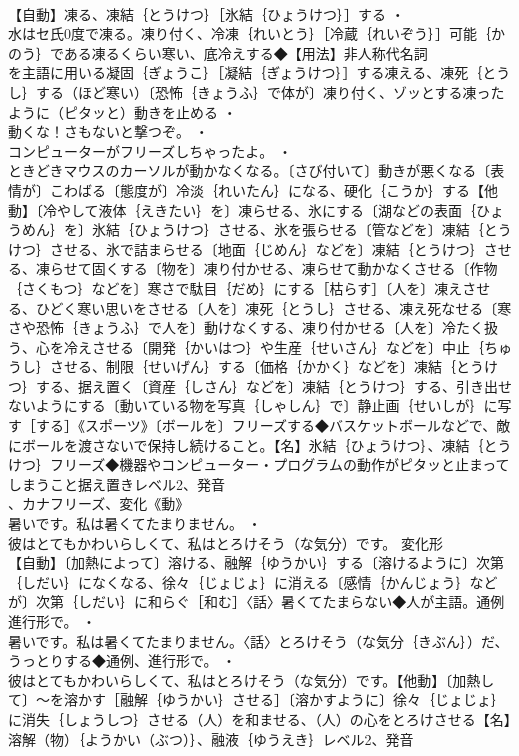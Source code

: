 \documentclass[8pt]{extreport}
\begin{document}
\begin{CJK}{UTF8}{min}
\\	【自動】凍る、凍結｛とうけつ｝［氷結｛ひょうけつ｝］する ・
\\	水はセ氏0度で凍る。凍り付く、冷凍｛れいとう｝［冷蔵｛れいぞう｝］可能｛かのう｝である凍るくらい寒い、底冷えする◆【用法】非人称代名詞
\\	を主語に用いる凝固｛ぎょうこ｝［凝結｛ぎょうけつ｝］する凍える、凍死｛とうし｝する（ほど寒い）〔恐怖｛きょうふ｝で体が〕凍り付く、ゾッとする凍ったように（ピタッと）動きを止める ・
\\	動くな！さもないと撃つぞ。 ・
\\	コンピューターがフリーズしちゃったよ。 ・
\\	ときどきマウスのカーソルが動かなくなる。〔さび付いて〕動きが悪くなる〔表情が〕こわばる〔態度が〕冷淡｛れいたん｝になる、硬化｛こうか｝する【他動】〔冷やして液体｛えきたい｝を〕凍らせる、氷にする〔湖などの表面｛ひょうめん｝を〕氷結｛ひょうけつ｝させる、氷を張らせる〔管などを〕凍結｛とうけつ｝させる、氷で詰まらせる〔地面｛じめん｝などを〕凍結｛とうけつ｝させる、凍らせて固くする〔物を〕凍り付かせる、凍らせて動かなくさせる〔作物｛さくもつ｝などを〕寒さで駄目｛だめ｝にする［枯らす］〔人を〕凍えさせる、ひどく寒い思いをさせる〔人を〕凍死｛とうし｝させる、凍え死なせる〔寒さや恐怖｛きょうふ｝で人を〕動けなくする、凍り付かせる〔人を〕冷たく扱う、心を冷えさせる〔開発｛かいはつ｝や生産｛せいさん｝などを〕中止｛ちゅうし｝させる、制限｛せいげん｝する〔価格｛かかく｝などを〕凍結｛とうけつ｝する、据え置く〔資産｛しさん｝などを〕凍結｛とうけつ｝する、引き出せないようにする〔動いている物を写真｛しゃしん｝で〕静止画｛せいしが｝に写す［する］《スポーツ》〔ボールを〕フリーズする◆バスケットボールなどで、敵にボールを渡さないで保持し続けること。【名】氷結｛ひょうけつ｝、凍結｛とうけつ｝フリーズ◆機器やコンピューター・プログラムの動作がピタッと止まってしまうこと据え置きレベル2、発音
\\	、カナフリーズ、変化《動》
\\	暑いです。私は暑くてたまりません。 ・
\\	彼はとてもかわいらしくて、私はとろけそう（な気分）です。	変化形 
\\	【自動】〔加熱によって〕溶ける、融解｛ゆうかい｝する〔溶けるように〕次第｛しだい｝になくなる、徐々｛じょじょ｝に消える〔感情｛かんじょう｝などが〕次第｛しだい｝に和らぐ［和む］〈話〉暑くてたまらない◆人が主語。通例進行形で。 ・
\\	暑いです。私は暑くてたまりません。〈話〉とろけそう（な気分｛きぶん｝）だ、うっとりする◆通例、進行形で。 ・
\\	彼はとてもかわいらしくて、私はとろけそう（な気分）です。【他動】〔加熱して〕～を溶かす［融解｛ゆうかい｝させる］〔溶かすように〕徐々｛じょじょ｝に消失｛しょうしつ｝させる（人）を和ませる、（人）の心をとろけさせる【名】溶解（物）｛ようかい（ぶつ）｝、融液｛ゆうえき｝レベル2、発音

\end{CJK}
\end{document}
